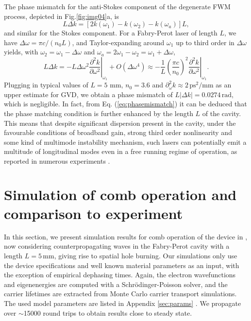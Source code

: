 \documentclass[10pt]{article}
\begin{document}
	The phase mismatch for the anti-Stokes component of the degenerate FWM
	process, depicted in Fig.\ref{fig:img04}a, is \cite{butcher1991elements}
	\begin{equation}
		L\Delta k=\left[  2k(\omega_{1})-k(\omega_{2})-k(\omega_{a})\right]  L,
	\end{equation}
	and similar for the Stokes component. For a Fabry-Perot laser of length $L$,
	we have $\Delta\omega=\pi c/\left(  n_{0}L\right)  $, and Taylor-expanding
	around $\omega_{1}$ up to third order in $\Delta\omega$ yields, with
	$\omega_{2}=\omega_{1}-\Delta\omega$ and $\omega_{a}=2\omega_{1}-\omega
	_{2}=\omega_{1}+\Delta\omega$,
	\begin{equation}
		L\Delta k=-L\Delta\omega^{2}\left.  \frac{\partial^{2}k}{\partial\omega^{2}%
		}\right|  _{\omega_{1}}+O(\Delta\omega^{4})\approx-\frac{1}{L}\left(
		\frac{\pi c}{n_{0}}\right)  ^{2}\left.  \frac{\partial^{2}k}{\partial
			\omega^{2}}\right|  _{\omega_{1}}.\label{eq:phasemismatch}
	\end{equation}
	Plugging in typical values of $L=5$ mm, $n_{0}=3.6$ and $\partial_{\omega}%
	^{2}k\approx2{\,}\mathrm{ps}^{2}/\mathrm{mm}$ as an upper estimate for GVD, we
	obtain a phase mismatch of $L\left|  \Delta k\right|  =0.0274{\,}\mathrm{rad}%
	$, which is negligible. In fact, from Eq. (\ref{eq:phasemismatch}) it can be deduced that the 
	phase matching condition is further enhanced by the length $L$ of the cavity. This means that despite significant dispersion present
	in the cavity, under the favourable conditions of broadband gain, strong third
	order nonlinearity and some kind of multimode instability mechanism, such
	lasers can potentially emit a multitude of longitudinal modes even in a free
	running regime of operation, as reported in numerous experiments
	\cite{wienold2014evidence,burghoff2014terahertz,hugi2012mid,rosch2015octave}.
	
	\section{Simulation of comb operation and comparison to experiment}
	\label{sec:tdsims}
	In this section, we present simulation results for comb operation of the
	device in \cite{burghoff2014terahertz}, now considering counterpropagating
	waves in the Fabry-Perot cavity with a length $L=5{\,}\mathrm{mm}$, giving
	rise to spatial hole burning. Our simulations only use the device
	specifications and well known material parameters as an input, with the
	exception of empirical dephasing times. Again, the electron wavefunctions and
	eigenenergies are computed with a Schr{\"{o}}dinger-Poisson solver, and the
	carrier lifetimes are extracted from Monte Carlo carrier transport
	simulations. The used model parameters are listed in Appendix \ref{sec:params}%
	. We propagate over $\sim$15000 round trips to obtain results close to steady state.
	
\end{document}
